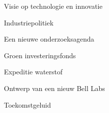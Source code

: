 
\begin{voorstel}{Visie op technologie en innovatie}\end{voorstel}

\begin{voorstel}{Industriepolitiek}\end{voorstel}
\begin{voorstel}{Een nieuwe onderzoeksagenda}\end{voorstel}
\begin{voorstel}{Groen investeringsfonds}\end{voorstel}
\begin{voorstel}{Expeditie waterstof}\end{voorstel}
\begin{voorstel}{Ontwerp van een nieuw Bell Labs}\end{voorstel}
\begin{voorstel}{Toekomstgeluid}\end{voorstel}
